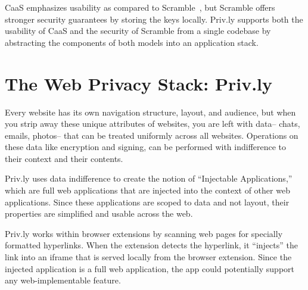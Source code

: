 \documentclass[letterpaper,twocolumn,10pt]{article}
\begin{document}
CaaS emphasizes usability as compared to Scramble~\cite{Fahl2012b}, but Scramble 
offers stronger security guarantees by storing the keys locally. Priv.ly supports 
both the usability of CaaS and the security of Scramble from a single codebase by 
abstracting the components of both models into an application stack.

\section{The Web Privacy Stack: Priv.ly} \label{sec:privly_architecture}

Every website has its own navigation structure, layout, and audience, but when 
you strip away these unique attributes of websites, you are left with data-- chats, 
emails, photos-- that can be treated uniformly across all websites. Operations on 
these data like encryption and signing, can be performed with indifference to their 
context and their contents.

Priv.ly uses data indifference to create the notion of ``Injectable Applications,'' 
which are full web applications that are injected into the context of other web 
applications. Since these applications are scoped to data and not layout, their 
properties are simplified and usable across the web.

Priv.ly works within browser extensions by scanning web pages for specially 
formatted hyperlinks. When the extension detects the hyperlink, it ``injects'' 
the link into an iframe that is served locally from the browser extension. 
Since the injected application is a full web application, the app could 
potentially support any web-implementable feature.
\end{document}
